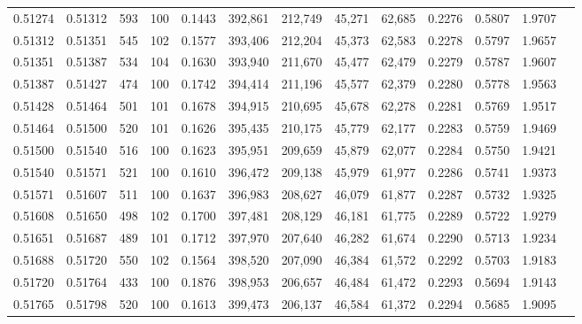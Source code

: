 \begin{tabular}{rrrrrrrrrrrrr}
0.51274 & 0.51312 &   593 & 100 &                                     0.1443 & 392,861 & 212,749 &  45,271 &  62,685 & 0.2276 & 0.5807 & 1.9707 \\
0.51312 & 0.51351 &   545 & 102 &                                     0.1577 & 393,406 & 212,204 &  45,373 &  62,583 & 0.2278 & 0.5797 & 1.9657 \\
0.51351 & 0.51387 &   534 & 104 &                                     0.1630 & 393,940 & 211,670 &  45,477 &  62,479 & 0.2279 & 0.5787 & 1.9607 \\
0.51387 & 0.51427 &   474 & 100 &                                     0.1742 & 394,414 & 211,196 &  45,577 &  62,379 & 0.2280 & 0.5778 & 1.9563 \\
0.51428 & 0.51464 &   501 & 101 &                                     0.1678 & 394,915 & 210,695 &  45,678 &  62,278 & 0.2281 & 0.5769 & 1.9517 \\
0.51464 & 0.51500 &   520 & 101 &                                     0.1626 & 395,435 & 210,175 &  45,779 &  62,177 & 0.2283 & 0.5759 & 1.9469 \\
0.51500 & 0.51540 &   516 & 100 &                                     0.1623 & 395,951 & 209,659 &  45,879 &  62,077 & 0.2284 & 0.5750 & 1.9421 \\
0.51540 & 0.51571 &   521 & 100 &                                     0.1610 & 396,472 & 209,138 &  45,979 &  61,977 & 0.2286 & 0.5741 & 1.9373 \\
0.51571 & 0.51607 &   511 & 100 &                                     0.1637 & 396,983 & 208,627 &  46,079 &  61,877 & 0.2287 & 0.5732 & 1.9325 \\
0.51608 & 0.51650 &   498 & 102 &                                     0.1700 & 397,481 & 208,129 &  46,181 &  61,775 & 0.2289 & 0.5722 & 1.9279 \\
0.51651 & 0.51687 &   489 & 101 &                                     0.1712 & 397,970 & 207,640 &  46,282 &  61,674 & 0.2290 & 0.5713 & 1.9234 \\
0.51688 & 0.51720 &   550 & 102 &                                     0.1564 & 398,520 & 207,090 &  46,384 &  61,572 & 0.2292 & 0.5703 & 1.9183 \\
0.51720 & 0.51764 &   433 & 100 &                                     0.1876 & 398,953 & 206,657 &  46,484 &  61,472 & 0.2293 & 0.5694 & 1.9143 \\
0.51765 & 0.51798 &   520 & 100 &                                     0.1613 & 399,473 & 206,137 &  46,584 &  61,372 & 0.2294 & 0.5685 & 1.9095 \\

\end{tabular}
